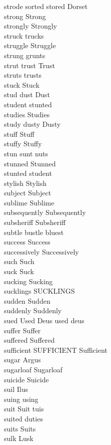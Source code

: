 strode sorted stored Dorset\\
strong Strong\\
strongly Strongly\\
struck trucks\\
struggle Struggle\\
strung grunts\\
strut trust Trust\\
struts trusts\\
stuck Stuck\\
stud dust Dust\\
student stunted\\
studies Studies\\
study dusty Dusty\\
stuff Stuff\\
stuffy Stuffy\\
stun sunt nuts\\
stunned Stunned\\
stunted student\\
stylish Stylish\\
subject Subject\\
sublime Sublime\\
subsequently Subsequently\\
subsheriff Subsheriff\\
subtle bustle bluest\\
success Success\\
successively Successively\\
such Such\\
suck Suck\\
sucking Sucking\\
sucklings SUCKLINGS\\
sudden Sudden\\
suddenly Suddenly\\
sued Used Deus used deus\\
suffer Suffer\\
suffered Suffered\\
sufficient SUFFICIENT Sufficient\\
sugar Argus\\
sugarloaf Sugarloaf\\
suicide Suicide\\
suil Ilus\\
suing using\\
suit Suit tuis\\
suited duties\\
suits Suits\\
sulk Lusk\\
